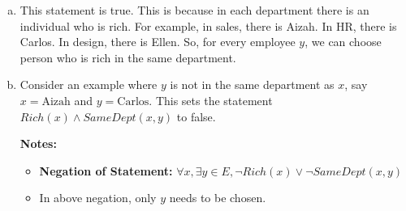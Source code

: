 \documentclass[12pt]{article}
\begin{document}
\begin{enumerate}[a.]
    \item

    This statement is true. This is because in each department there is an
    individual who is rich. For example, in sales, there is Aizah. In HR, there
    is Carlos. In design, there is Ellen. So, for every employee $y$, we can choose
    person who is rich in the same department.

    \item

    Consider an example where $y$ is not in the same department as $x$, say $x = \text{Aizah}$
    and $y = \text{Carlos}$. This sets the statement $Rich(x) \land SameDept(x,y)$ to false.

    \bigskip

    \textbf{Notes:}

    \begin{itemize}
        \item \textbf{Negation of Statement:} $\forall x, \exists y \in E, \neg Rich(x) \lor \neg SameDept(x,y)$
        \item In above negation, only $y$ needs to be chosen.
    \end{itemize}

\end{enumerate}

\newpage
\end{document}
